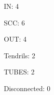 \documentclass{article}
\begin{document}
  IN:  4
  
  SCC: 6
  
  OUT: 4
 
  Tendrils: 2

  TUBES: 2

  Disconnected: 0
\end{document}
